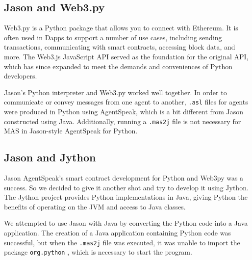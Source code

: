 \subsection{Jason and Web3.py}

Web3.py is a Python package that allows you to connect with Ethereum. It is often used in \ac{Dapp}s to support a number of use cases, including sending transactions, communicating with smart contracts, accessing block data, and more. The Web3.js JavaScript \ac{API} served as the foundation for the original \ac{API}, which has since expanded to meet the demands and conveniences of Python developers.

\vspace{.5cm}

Jason's Python interpreter and Web3.py worked well together. In order to communicate or convey messages from one agent to another, \texttt{.asl} files for agents were produced in Python using AgentSpeak, which is a bit different from Jason constructed using Java. Additionally, running a \texttt{.mas2j} file is not necessary for \ac{MAS} in Jason-style AgentSpeak for Python.

\subsection{Jason and Jython}

Jason AgentSpeak's smart contract development for Python and Web3py was a success. So we decided to give it another shot and try to develop it using Jython. The Jython project provides Python implementations in Java, giving Python the benefits of operating on the JVM and access to Java classes.

\vspace{.5cm}

We attempted to use Jason with Java by converting the Python code into a Java application. The creation of a Java application containing Python code was successful, but when the \texttt{.mas2j} file was executed, it was unable to import the package \texttt{org.python} , which is necessary to start the program.